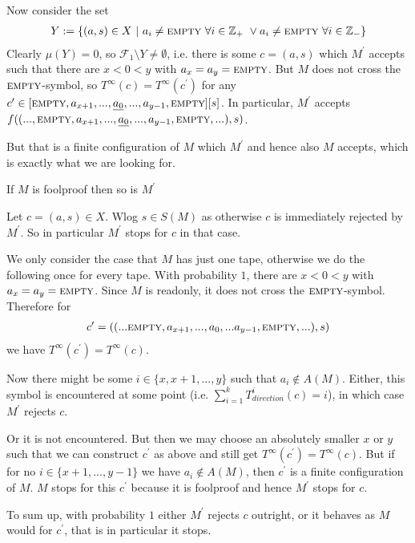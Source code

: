 		Now consider the set
		\begin{align*}
			Y := \{ (a,s) \in X ~|~ a_i \neq \text{\scshape{empty}} ~\forall i \in \mathbb{Z}_+ ~\vee a_i \neq \text{\scshape{empty}} ~\forall i \in \mathbb{Z}_{-} \}
		\end{align*}
		Clearly $\mu(Y) = 0$, so $\mathcal{F}_1 \setminus Y \neq \emptyset$, i.e. there is some $c = (a,s)$ which $M^\prime$ accepts such that there are $x < 0 < y$ with $a_x = a_y = \text{\scshape{empty}}$.
		But $M$ does not cross the $\text{\scshape{empty}}$-symbol, so $T^\infty(c) = T^\infty(c^\prime)$ for any $c^\prime \in \lbrack \text{\scshape{empty}}, a_{x+1}, ... , \underline{a_0}, ... , a_{y-1}, \text{\scshape{empty}} \rbrack \lbrack s \rbrack$.
		In particular, $M^\prime$ accepts $f((...,\text{\scshape{empty}},a_{x+1},...,\underline{a_0},...,a_{y-1},\text{\scshape{empty}},...),s)$.
		
		But that is a finite configuration of $M$ which $M^\prime$ and hence also $M$ accepts, which is exactly what we are looking for.
\endproof

\begin{Lemma}
	\label{tm_to_tds:properties:lemma_foolproof}
	If $M$ is foolproof then so is $M^\prime$
\end{Lemma}
\proof
	Let $c = (a,s) \in X$. Wlog $s \in S(M)$ as otherwise $c$ is immediately rejected by $M^\prime$. So in particular $M^\prime$ stops for $c$ in that case.

	We only consider the case that $M$ has just one tape, otherwise we do the following once for every tape.
	With probability $1$, there are $x < 0 < y$ with $a_x = a_y = \text{\scshape{empty}}$.
	Since $M$ is readonly, it does not cross the $\text{\scshape{empty}}$-symbol. Therefore for
	\begin{align*}
		c^\prime = ((...\text{\scshape{empty}},a_{x+1},...,a_0,...a_{y-1},\text{\scshape{empty}},...) , s)
	\end{align*} 
	we have $T^\infty(c^\prime) = T^\infty(c)$.

	Now there might be some $i \in \{x,x+1,...,y\}$ such that $a_i \notin A(M)$.
	Either, this symbol is encountered at some point (i.e. $\sum_{i=1}^k T_{direction}^i(c) = i$), in which case $M^\prime$ rejects $c$.

	Or it is not encountered. But then we may choose an absolutely smaller $x$ or $y$ such that we can construct $c^\prime$ as above and still get $T^\infty(c^\prime) = T^\infty(c)$.
	But if for no $i \in \{x+1,...,y-1\}$ we have $a_i \notin A(M)$, then $c^\prime$ is a finite configuration of $M$.
	$M$ stops for this $c^\prime$ because it is foolproof and hence $M^\prime$ stops for $c$.

	To sum up, with probability $1$ either $M^\prime$ rejects $c$ outright, or it behaves as $M$ would for $c^\prime$, that is in particular it stops.
\endproof

